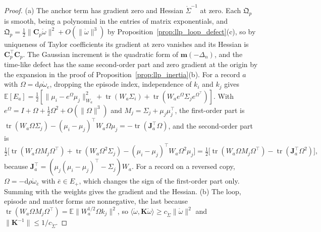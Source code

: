 \begin{proof}
(a) The anchor term has gradient zero and Hessian $\mathring\Sigma^{-1}$ at zero. Each $\mathfrak Q_p$ is smooth, being a polynomial in the entries of matrix exponentials, and $\mathfrak Q_p=\frac12\|\mathbf C_p\mathring\omega\|^2+O(\|\mathring\omega\|^3)$ by Proposition~\ref{prop:llp_loop_defect}(c), so by uniqueness of Taylor coefficients its gradient at zero vanishes and its Hessian is $\mathbf C_p^\top\mathbf C_p$. The Gaussian increment is the quadratic form of $\mathbf m(-\Delta_n)$, and the time-like defect has the same second-order part and zero gradient at the origin by the expansion in the proof of Proposition~\ref{prop:llp_inertia}(b). For a record $a$ with $\Omega=\mathrm d\rho\mathring\omega_e$, dropping the episode index, independence of $k_i$ and $k_j$ gives $\mathbb E[E_a]=\frac12[\|\mu_i-e^{\Omega}\mu_j\|_{W_a}^2+\operatorname{tr}(W_a\Sigma_i)+\operatorname{tr}(W_ae^\Omega\Sigma_je^{\Omega^\top})]$. With $e^\Omega=I+\Omega+\frac12\Omega^2+O(\|\Omega\|^3)$ and $M_j=\Sigma_j+\mu_j\mu_j^\top$, the first-order part is $\operatorname{tr}(W_a\Omega\Sigma_j)-(\mu_i-\mu_j)^\top W_a\Omega\mu_j=-\operatorname{tr}(\mathbf J_a^\top\Omega)$, and the second-order part is
\begin{equation*}
\tfrac12\bigl[\operatorname{tr}(W_a\Omega M_j\Omega^\top)+\operatorname{tr}(W_a\Omega^2\Sigma_j)-(\mu_i-\mu_j)^\top W_a\Omega^2\mu_j\bigr]=\tfrac12\bigl[\operatorname{tr}(W_a\Omega M_j\Omega^\top)-\operatorname{tr}(\mathbf J_a^\top\Omega^2)\bigr],
\end{equation*}
because $\mathbf J_a^\top=(\mu_j(\mu_i-\mu_j)^\top-\Sigma_j)W_a$. For a record on a reversed copy, $\Omega=-\mathrm d\rho\mathring\omega_{\bar e}$ with $\bar e\in E_+$, which changes the sign of the first-order part only. Summing with the weights gives the gradient and the Hessian.
(b) The loop, episode and matter forms are nonnegative, the last because $\operatorname{tr}(W_a\Omega M_j\Omega^\top)=\mathbb E\|W_a^{1/2}\Omega k_j\|^2$, so $\langle\mathring\omega,\mathbf K\mathring\omega\rangle\geq c_{\mathring\Sigma}\|\mathring\omega\|^2$ and $\|\mathbf K^{-1}\|\leq1/c_{\mathring\Sigma}$.

\end{proof}
